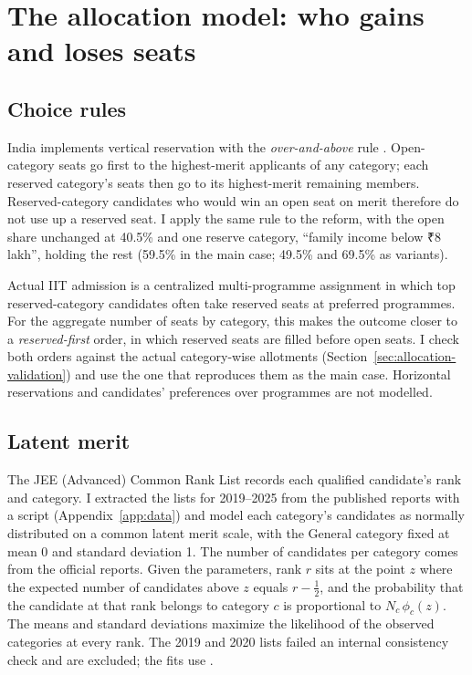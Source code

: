 \documentclass[11pt,a4paper]{article}
\newcommand{\rupee}{{\rupeefont ₹}}
\begin{document}
\section{The allocation model: who gains and loses seats}
\label{sec:allocation}

\subsection{Choice rules}
India implements vertical reservation with the \emph{over-and-above} rule \citep{sonmez2022,aygun2023characterization}. Open-category seats go first to the highest-merit applicants of any category; each reserved category's seats then go to its highest-merit remaining members. Reserved-category candidates who would win an open seat on merit therefore do not use up a reserved seat. I apply the same rule to the reform, with the open share unchanged at 40.5\% and one reserve category, ``family income below \rupee8 lakh'', holding the rest (59.5\% in the main case; 49.5\% and 69.5\% as variants).

Actual IIT admission is a centralized multi-programme assignment in which top reserved-category candidates often take reserved seats at preferred programmes. For the aggregate number of seats by category, this makes the outcome closer to a \emph{reserved-first} order, in which reserved seats are filled before open seats. I check both orders against the actual category-wise allotments (Section~\ref{sec:allocation-validation}) and use the one that reproduces them as the main case. Horizontal reservations and candidates' preferences over programmes are not modelled.

\subsection{Latent merit}
The JEE (Advanced) Common Rank List records each qualified candidate's rank and category. I extracted the lists for 2019--2025 from the published reports with a script (Appendix~\ref{app:data}) and model each category's candidates as normally distributed on a common latent merit scale, with the General category fixed at mean 0 and standard deviation 1. The number of candidates per category comes from the official reports. Given the parameters, rank $r$ sits at the point $z$ where the expected number of candidates above $z$ equals $r-\tfrac12$, and the probability that the candidate at that rank belongs to category $c$ is proportional to $N_c\,\phi_c(z)$. The means and standard deviations maximize the likelihood of the observed categories at every rank. The 2019 and 2020 lists failed an internal consistency check and are excluded; the fits use \AllocYears.
\end{document}
